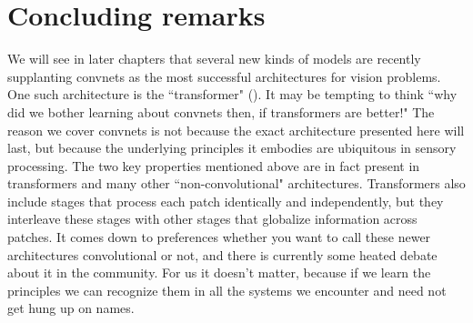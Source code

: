 










\section{Concluding remarks}
We will see in later chapters that several new kinds of models are recently supplanting convnets as the most successful architectures for vision problems. One such architecture is the ``transformer" (\chap{\ref{chapter:transformers}}). It may be tempting to think ``why did we bother learning about convnets then, if transformers are better!" The reason we cover convnets is not because the exact architecture presented here will last, but because the underlying principles it embodies are ubiquitous in sensory processing. The two key properties mentioned above are in fact present in transformers and many other ``non-convolutional" architectures. Transformers also include stages that process each patch identically and independently, but they interleave these stages with other stages that globalize information across patches. It comes down to preferences whether you want to call these newer architectures convolutional or not, and there is currently some heated debate about it in the community. For us it doesn't matter, because if we learn the principles we can recognize them in all the systems we encounter and need not get hung up on names.

